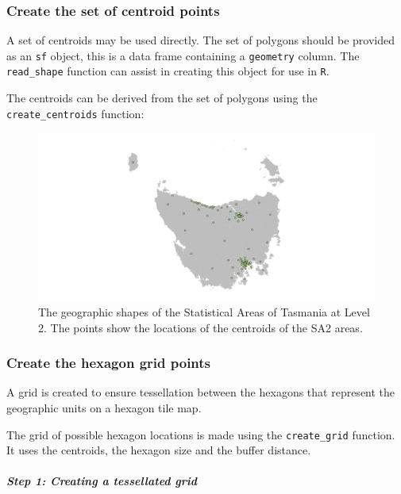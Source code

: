 \documentclass{monashthesis}
\begin{document}
\hypertarget{create-the-set-of-centroid-points}{%
\subsubsection{Create the set of centroid points}\label{create-the-set-of-centroid-points}}

A set of centroids may be used directly. The set of polygons should be provided as an \texttt{sf} object, this is a data frame containing a \texttt{geometry} column. The \texttt{read\_shape} function can assist in creating this object for use in \texttt{R}.

The centroids can be derived from the set of polygons using the \texttt{create\_centroids} function:

\begin{figure}[H]
\centering
\includegraphics[width=14cm]{figures/03-algorithm/1centroids.png}
\caption{\label{fig:centroids_plot}The geographic shapes of the Statistical Areas of Tasmania at Level 2. The points show the locations of the centroids of the SA2 areas.}
\end{figure}

\hypertarget{create-the-hexagon-grid-points}{%
\subsubsection{Create the hexagon grid points}\label{create-the-hexagon-grid-points}}

A grid is created to ensure tessellation between the hexagons that represent the geographic units on a hexagon tile map.

The grid of possible hexagon locations is made using the \texttt{create\_grid} function.
It uses the centroids, the hexagon size and the buffer distance.

\hypertarget{step-1-creating-a-tessellated-grid}{%
\subparagraph{Step 1: Creating a tessellated grid}\label{step-1-creating-a-tessellated-grid}}
\end{document}
